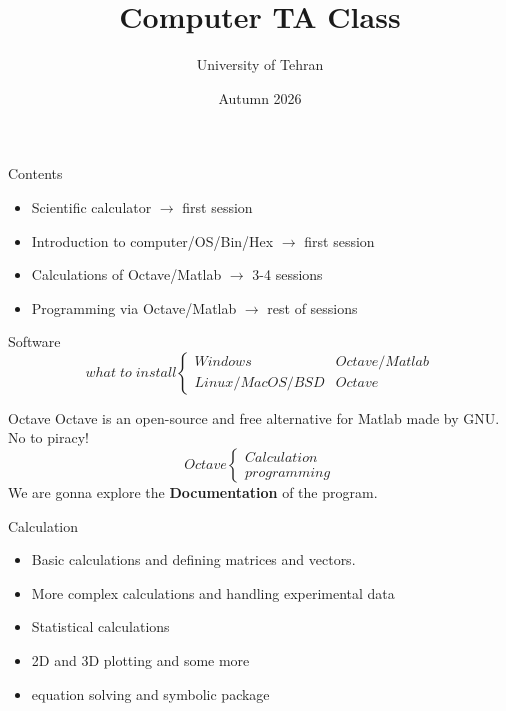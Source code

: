 \documentclass{beamer}
\title{Computer TA Class}
\author{University of Tehran}
\date{Autumn 2026}
\begin{document}
	\frame{\titlepage}
		\begin{frame}{Contents}
		
		\begin{itemize}	
			
			\item Scientific calculator $\rightarrow$ first session
			\item Introduction to computer/OS/Bin/Hex $\rightarrow$ first session
			\item Calculations of Octave/Matlab $\rightarrow$ 3-4 sessions
			\item Programming via Octave/Matlab $\rightarrow$ rest of sessions
			
		\end{itemize}
	\end{frame}
	
	\begin{frame}{Software}
		\[
			what\; to\; install
			\begin{cases}
				Windows & Octave/Matlab \\
				Linux/MacOS/BSD & Octave
			\end{cases}
		\]
	\end{frame}
	
	\begin{frame}{Octave}
		Octave is an open-source and free alternative for Matlab made by GNU. No to piracy! 
		\vspace*{1cm}
		\[
		Octave
		\begin{cases}
			Calculation  \\
			programming  
		\end{cases}
		\]
		We are gonna explore the \textbf{Documentation} of the program.
	\end{frame}
	
	\begin{frame}{Calculation}
		\begin{itemize}
			\item Basic calculations and defining matrices and vectors.
			\item More complex calculations and handling experimental data
			\item Statistical calculations
			\item 2D and 3D plotting and some more
			\item equation solving and symbolic package
		\end{itemize}
	\end{frame}
	
\end{document}

